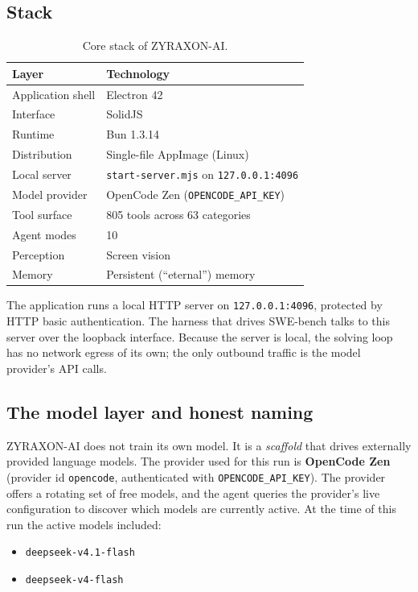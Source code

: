 \documentclass[11pt,a4paper]{article}
\begin{document}
\subsection{Stack}

\begin{table}[H]
\centering
\caption{Core stack of ZYRAXON-AI.}
\label{tab:stack}
\begin{tabular}{@{}ll@{}}
\toprule
Layer & Technology \\
\midrule
Application shell & Electron 42 \\
Interface & SolidJS \\
Runtime & Bun 1.3.14 \\
Distribution & Single-file AppImage (Linux) \\
Local server & \texttt{start-server.mjs} on \texttt{127.0.0.1:4096} \\
Model provider & OpenCode Zen (\texttt{OPENCODE\_API\_KEY}) \\
Tool surface & 805 tools across 63 categories \\
Agent modes & 10 \\
Perception & Screen vision \\
Memory & Persistent (``eternal'') memory \\
\bottomrule
\end{tabular}
\end{table}

The application runs a local HTTP server on \texttt{127.0.0.1:4096}, protected by HTTP
basic authentication. The harness that drives SWE-bench talks to this server over the
loopback interface. Because the server is local, the solving loop has no network egress
of its own; the only outbound traffic is the model provider's API calls.

\subsection{The model layer and honest naming}

ZYRAXON-AI does not train its own model. It is a \emph{scaffold} that drives externally
provided language models. The provider used for this run is \textbf{OpenCode Zen}
(provider id \texttt{opencode}, authenticated with \texttt{OPENCODE\_API\_KEY}). The
provider offers a rotating set of free models, and the agent queries the provider's live
configuration to discover which models are currently active. At the time of this run the
active models included:

\begin{itemize}[leftmargin=1.2em]
  \item \texttt{deepseek-v4.1-flash}
  \item \texttt{deepseek-v4-flash}
\end{itemize}
\end{document}
